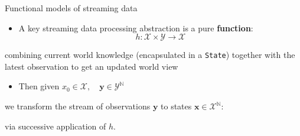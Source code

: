 \begin{frame}[fragile]{Functional models of streaming data}
\protect\hypertarget{functional-models-of-streaming-data}{}

\begin{itemize}
\tightlist
\item
  A key streaming data processing abstraction is a pure
  \textbf{function}:
  \[h: \mathcal{X} \times \mathcal{Y} \longrightarrow \mathcal{X}\]
\end{itemize}

\begin{Shaded}
\begin{Highlighting}[]
\end{Highlighting}
\end{Shaded}

combining current world knowledge (encapsulated in a \texttt{State})
together with the latest observation to get an updated world view

\begin{itemize}
\tightlist
\item
  Then given
  \(x_0\in\mathcal{X},\quad \mathbf{y} \in \mathcal{Y}^{\mathbb{N}}\)
\end{itemize}

\begin{Shaded}
\begin{Highlighting}[]
\end{Highlighting}
\end{Shaded}

we transform the stream of observations \(\mathbf{y}\) to states
\(\mathbf{x}\in\mathcal{X}^{\mathbb{N}}\):

\begin{Shaded}
\begin{Highlighting}[]
\end{Highlighting}
\end{Shaded}

via successive application of \(h\).

\end{frame}

